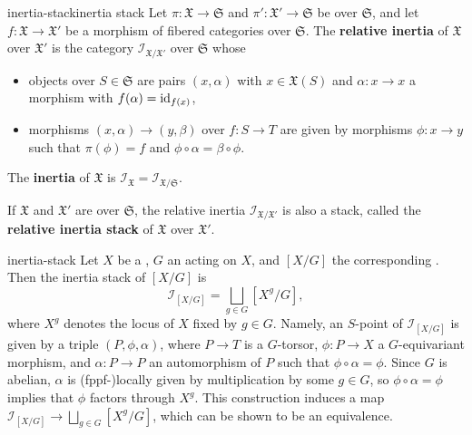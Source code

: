 \begin{topic}{inertia-stack}{inertia stack}
    Let $\pi : \mathfrak{X} \to \mathfrak{S}$ and $\pi' : \mathfrak{X}' \to \mathfrak{S}$ be  over $\mathfrak{S}$, and let $f : \mathfrak{X} \to \mathfrak{X}'$ be a morphism of fibered categories over $\mathfrak{S}$. The \textbf{relative inertia} of $\mathfrak{X}$ over $\mathfrak{X}'$ is the category $\mathcal{I}_{\mathfrak{X}/\mathfrak{X}'}$ over $\mathfrak{S}$ whose
    \begin{itemize}
        \item objects over $S \in \mathfrak{S}$ are pairs $(x, \alpha)$ with $x \in \mathfrak{X}(S)$ and $\alpha : x \to x$ a morphism with $f(\alpha) = \textup{id}_{f(x)}$,
        \item morphisms $(x, \alpha) \to (y, \beta)$ over $f : S \to T$ are given by morphisms $\phi : x \to y$ such that $\pi(\phi) = f$ and $\phi \circ \alpha = \beta \circ \phi$.
    \end{itemize}
    The \textbf{inertia} of $\mathfrak{X}$ is $\mathcal{I}_\mathfrak{X} = \mathcal{I}_{\mathfrak{X}/\mathfrak{S}}$.
    
    If $\mathfrak{X}$ and $\mathfrak{X}'$ are  over $\mathfrak{S}$, the relative inertia $\mathcal{I}_{\mathfrak{X}/\mathfrak{X}'}$ is also a stack, called the \textbf{relative inertia stack} of $\mathfrak{X}$ over $\mathfrak{X}'$.
\end{topic}

\begin{example}{inertia-stack}
    Let $X$ be a , $G$ an  acting on $X$, and $[X/G]$ the corresponding . Then the inertia stack of $[X/G]$ is
    \[ \mathcal{I}_{[X/G]} = \bigsqcup_{g \in G} [X^g / G] , \]
    where $X^g$ denotes the locus of $X$ fixed by $g \in G$. Namely, an $S$-point of $\mathcal{I}_{[X/G]}$ is given by a triple $(P, \phi, \alpha)$, where $P \to T$ is a $G$-torsor, $\phi : P \to X$ a $G$-equivariant morphism, and $\alpha : P \to P$ an automorphism of $P$ such that $\phi \circ \alpha = \phi$. Since $G$ is abelian, $\alpha$ is (fppf-)locally given by multiplication by some $g \in G$, so $\phi \circ \alpha = \phi$ implies that $\phi$ factors through $X^g$. This construction induces a map $\mathcal{I}_{[X/G]} \to \bigsqcup_{g \in G} [X^g/G]$, which can be shown to be an equivalence.
\end{example}
